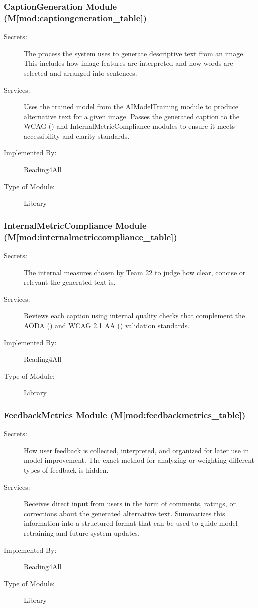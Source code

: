 \documentclass[12pt, titlepage]{article}
\newcommand{\mref}[1]{M\ref{#1}}
\begin{document}
\subsubsection{CaptionGeneration Module (\mref{mod:captiongeneration_table})}
\label{mod:captiongeneration}
\begin{description}
  \item[Secrets:] The process the system uses to generate descriptive
    text from an image. This includes how image features are
    interpreted and how words are selected and arranged into sentences.
  \item[Services:] Uses the trained model from the AIModelTraining
    module to produce alternative text
    for a given image. Passes the generated caption to the WCAG
    (\citet{WCAG}) and
    InternalMetricCompliance modules to ensure it meets accessibility
    and clarity standards.
  \item[Implemented By:] Reading4All
  \item[Type of Module:] Library
\end{description}

\subsubsection{InternalMetricCompliance Module
(\mref{mod:internalmetriccompliance_table})}
\label{mod:internalmetriccompliance}
\begin{description}
  \item[Secrets:] The internal measures chosen by Team 22 to judge
    how clear, concise or relevant the generated text is.
  \item[Services:] Reviews each caption using internal quality checks
    that complement the AODA (\citet{AODA}) and WCAG 2.1 AA
    (\citet{WCAG}) validation standards.
  \item[Implemented By:] Reading4All
  \item[Type of Module:] Library
\end{description}

\subsubsection{FeedbackMetrics Module (\mref{mod:feedbackmetrics_table})}
\label{mod:feedbackmetrics}
\begin{description}
  \item[Secrets:] How user feedback is collected, interpreted, and
    organized for later use in model improvement. The exact method
    for analyzing or weighting different types of feedback is hidden.
  \item[Services:] Receives direct input from users in the form of
    comments, ratings, or corrections about the generated alternative
    text. Summarizes this information into a structured format that
    can be used to guide model retraining and future system updates.
  \item[Implemented By:] Reading4All
  \item[Type of Module:] Library
\end{description}
\end{document}
